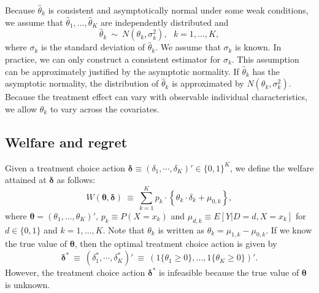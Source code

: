 \documentclass[12pt,a4paper]{article}
\begin{document}
Because $\hat{\theta}_k$ is consistent and asymptotically normal under some weak conditions, we assume that $\hat{\theta}_1, \ldots, \hat{\theta}_K$ are independently distributed and
\begin{equation}
\hat{\theta}_k \ \sim \ N (\theta_k, \sigma_k^2), \ \ \ k = 1, \ldots , K, \label{normality}
\end{equation}
where $\sigma_k$ is the standard deviation of $\hat{\theta}_k$. We assume that $\sigma_k$ is known. In practice, we can only construct a consistent estimator for $\sigma_k$. This assumption can be approximately justified by the asymptotic normality. If $\hat{\theta}_k$ has the asymptotic normality, the distribution of $\hat{\theta}_k$ is approximated by $N(\theta_k,\sigma_k^2)$. Because the treatment effect can vary with observable individual characteristics, we allow $\theta_k$ to vary across the covariates.

\subsection{Welfare and regret}\label{SubSec:welfare}
Given a treatment choice action $\bm{\delta} \equiv (\delta_1, \cdots, \delta_K)' \in \{0,1\}^K$, we define the welfare attained at $\bm{\delta}$ as follows:
\begin{equation}
W(\bm{\theta}, \bm{\delta}) \ \equiv \ \sum_{k=1}^K p_k \cdot \left\{ \theta_k \cdot \delta_k + \mu_{0,k} \right\}, \label{welfare}
\end{equation}
where $\bm{\theta}=(\theta_1,\dots,\theta_K)'$, $p_k \equiv P(X = x_k)$ and $\mu_{d,k} \equiv E[Y| D=d, X = x_k]$ for $d \in \{0,1\}$ and $k=1, \ldots, K$. Note that $\theta_k$ is written as $\theta_k = \mu_{1,k} - \mu_{0,k}$. If we know the true value of $\bm{\theta}$, then the optimal treatment choice action is given by
$$
\bm{\delta}^{\ast} \ \equiv \ \left( \delta_1^{\ast}, \cdots, \delta_K^{\ast} \right)' \ \equiv \ \left( 1\{\theta_1 \geq 0\}, \ldots, 1\{\theta_K \geq 0\} \right)'.
$$
However, the treatment choice action $\bm{\delta}^{\ast}$ is infeasible because the true value of $\bm{\theta}$ is unknown.
\end{document}
